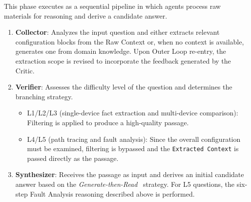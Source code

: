This phase executes as a sequential pipeline in which agents process raw materials for reasoning and derive a candidate answer.

\begin{enumerate}
  \item \textbf{Collector}: Analyzes the input question and either extracts relevant configuration blocks from the Raw Context or, when no context is available, generates one from domain knowledge.
        Upon Outer Loop re-entry, the extraction scope is revised to incorporate the feedback generated by the Critic.

  \item \textbf{Verifier}: Assesses the difficulty level of the question and determines the branching strategy.
        \begin{itemize}
          \item L1/L2/L3 (single-device fact extraction and multi-device comparison):
                Filtering is applied to produce a high-quality passage.
          \item L4/L5 (path tracing and fault analysis):
                Since the overall configuration must be examined, filtering is bypassed and the \texttt{Extracted Context} is passed directly as the passage.
        \end{itemize}

  \item \textbf{Synthesizer}: Receives the passage as input and derives an initial candidate answer based on the \textit{Generate-then-Read}~\cite{yu2023generate} strategy.
        For L5 questions, the six-step Fault Analysis reasoning described above is performed.
\end{enumerate}





